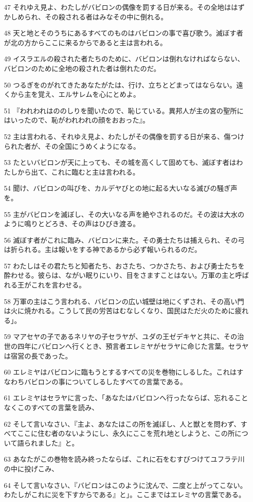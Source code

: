 \par 47 それゆえ見よ、わたしがバビロンの偶像を罰する日が来る。その全地ははずかしめられ、その殺される者はみなその中に倒れる。
\par 48 天と地とそのうちにあるすべてのものはバビロンの事で喜び歌う。滅ぼす者が北の方からここに来るからであると主は言われる。
\par 49 イスラエルの殺された者たちのために、バビロンは倒れなければならない、バビロンのために全地の殺された者は倒れたのだ。
\par 50 つるぎをのがれてきたあなたがたは、行け、立ちとどまってはならない。遠くから主を覚え、エルサレムを心にとめよ。
\par 51 『われわれはののしりを聞いたので、恥じている。異邦人が主の宮の聖所にはいったので、恥がわれわれの顔をおおった』。
\par 52 主は言われる、それゆえ見よ、わたしがその偶像を罰する日が来る、傷つけられた者が、その全国にうめくようになる。
\par 53 たといバビロンが天に上っても、その城を高くして固めても、滅ぼす者はわたしから出て、これに臨むと主は言われる。
\par 54 聞け、バビロンの叫びを、カルデヤびとの地に起る大いなる滅びの騒ぎ声を。
\par 55 主がバビロンを滅ぼし、その大いなる声を絶やされるのだ。その波は大水のように鳴りとどろき、その声はひびき渡る。
\par 56 滅ぼす者がこれに臨み、バビロンに来た。その勇士たちは捕えられ、その弓は折られる。主は報いをする神であるから必ず報いられるのだ。
\par 57 わたしはその君たちと知者たち、おさたち、つかさたち、および勇士たちを酔わせる。彼らは、ながい眠りにいり、目をさますことはない。万軍の主と呼ばれる王がこれを言わせる。
\par 58 万軍の主はこう言われる、バビロンの広い城壁は地にくずされ、その高い門は火に焼かれる。こうして民の労苦はむなしくなり、国民はただ火のために疲れる」。
\par 59 マアセヤの子であるネリヤの子セラヤが、ユダの王ゼデキヤと共に、その治世の四年にバビロンへ行くとき、預言者エレミヤがセラヤに命じた言葉。セラヤは宿営の長であった。
\par 60 エレミヤはバビロンに臨もうとするすべての災を巻物にしるした。これはすなわちバビロンの事についてしるしたすべての言葉である。
\par 61 エレミヤはセラヤに言った、「あなたはバビロンへ行ったならば、忘れることなくこのすべての言葉を読み、
\par 62 そして言いなさい、『主よ、あなたはこの所を滅ぼし、人と獣とを問わず、すべてここに住む者のないようにし、永久にここを荒れ地としようと、この所について語られました』と。
\par 63 あなたがこの巻物を読み終ったならば、これに石をむすびつけてユフラテ川の中に投げこみ、
\par 64 そして言いなさい、『バビロンはこのように沈んで、二度と上がってこない。わたしがこれに災を下すからである』と」。ここまではエレミヤの言葉である。

